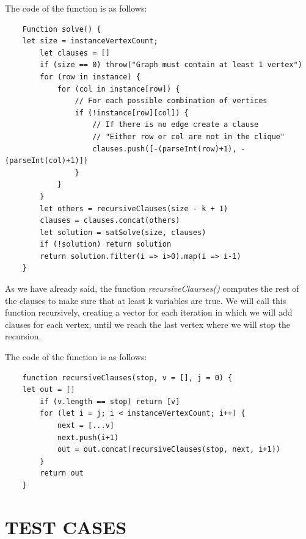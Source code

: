\documentclass[table]{article}
\begin{document}
The code of the function is as follows:

\begin{lstlisting}
    Function solve() {
	let size = instanceVertexCount;
    	let clauses = []
        if (size == 0) throw("Graph must contain at least 1 vertex")
        for (row in instance) {
            for (col in instance[row]) {
                // For each possible combination of vertices
                if (!instance[row][col]) {
                    // If there is no edge create a clause
                    // "Either row or col are not in the clique"
                    clauses.push([-(parseInt(row)+1), -(parseInt(col)+1)])
                }
            }
        }
        let others = recursiveClauses(size - k + 1)
        clauses = clauses.concat(others)
        let solution = satSolve(size, clauses)
        if (!solution) return solution 
        return solution.filter(i => i>0).map(i => i-1)
    }

\end{lstlisting}

As we have already said, the function \textit{recursiveClaurses()} computes the rest of the clauses to make sure that at least k variables are true. 
We will call this function recursively, creating a vector for each iteration in which we will add clauses for each vertex, until we reach the last vertex where we will stop the recursion.

The code of the function is as follows:

\begin{lstlisting}
    function recursiveClauses(stop, v = [], j = 0) {
    let out = []
        if (v.length == stop) return [v]
        for (let i = j; i < instanceVertexCount; i++) {
            next = [...v]
            next.push(i+1)
            out = out.concat(recursiveClauses(stop, next, i+1))
        }
        return out
    }

\end{lstlisting}


\section{TEST CASES}
\end{document}
